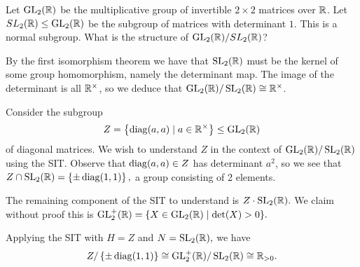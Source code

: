 









\begin{example}
  Let $\operatorname{GL}_2(\mathbb R)$ be the multiplicative group of invertible $2\times2$ matrices over $\mathbb R$. Let $SL_2(\mathbb R)\leq \operatorname{GL}_2(\mathbb R)$ be the subgroup
  of matrices with determinant $1$. This is a normal subgroup. What is the structure of
  $\operatorname{GL}_2(\mathbb R)/SL_2(\mathbb R)$? 
  
  By the first isomorphism theorem we have that $\operatorname{SL}_2(\mathbb R)$ must be the
  kernel of some group homomorphism, namely the determinant map. The image of the
  determinant is all $\mathbb R^{\times}$, so we deduce that
$\operatorname{GL}_2(\mathbb R)/\operatorname{SL}_2(\mathbb R)\cong \mathbb R^{\times}$. 
  
  Consider the subgroup
  \[Z= \left\{ \operatorname*{diag} (a,a) \mid a\in \mathbb R^{\times} \right\} \leq \operatorname{GL}_{2}(\mathbb R)\]
  of diagonal matrices. We wish to understand $Z$ in the context of $\operatorname{GL}_2(\mathbb R)/\operatorname{SL}_2(\mathbb R)$ using the SIT.
  Observe that $\operatorname*{diag}(a,a) \in Z$ has determinant $a^2$, so we see that $Z\cap \operatorname{SL}_{2}(\mathbb R) = \left\{ \pm
  \operatorname*{diag}(1,1) \right\},$ a group consisting of 2 elements. 

  The remaining component of the SIT to understand is $Z\cdot \operatorname{SL}_2(\mathbb R).$ We claim without proof this is $\operatorname{GL}_2^+(\mathbb R) = \{X \in \operatorname{GL}_{2}(\mathbb R) \mid \det(X) > 0\}.$

  Applying the SIT with  $H=Z$ and $N=\operatorname{SL}_2(\mathbb R),$ we have
  $$
  Z/\left\{ \pm \operatorname*{diag}(1,1) \right\} \cong \operatorname{GL}_2^+(\mathbb R)/ \operatorname{SL}_2(\mathbb R) \cong \mathbb R_{>0}.
  $$
\end{example}

